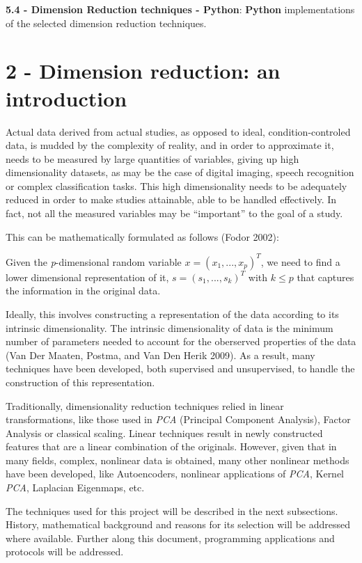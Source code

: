 \documentclass[]{article}
\begin{document}
\textbf{5.4 - Dimension Reduction techniques - Python}: \textbf{Python}
implementations of the selected dimension reduction techniques.

\section{2 - Dimension reduction: an
introduction}\label{dimension-reduction-an-introduction}

Actual data derived from actual studies, as opposed to ideal,
condition-controled data, is mudded by the complexity of reality, and in
order to approximate it, needs to be measured by large quantities of
variables, giving up high dimensionality datasets, as may be the case of
digital imaging, speech recognition or complex classification tasks.
This high dimensionality needs to be adequately reduced in order to make
studies attainable, able to be handled effectively. In fact, not all the
measured variables may be ``important'' to the goal of a study.

This can be mathematically formulated as follows (Fodor 2002):

Given the \emph{p}-dimensional random variable
\(x = (x_1,...,x_p)^{T}\), we need to find a lower dimensional
representation of it, \(s = (s_1,...,s_k)^T\) with \(k \le p\) that
captures the information in the original data.

Ideally, this involves constructing a representation of the data
according to its intrinsic dimensionality. The intrinsic dimensionality
of data is the minimum number of parameters needed to account for the
oberserved properties of the data ({Van Der Maaten}, Postma, and {Van
Den Herik} 2009). As a result, many techniques have been developed, both
supervised and unsupervised, to handle the construction of this
representation.

Traditionally, dimensionality reduction techniques relied in linear
transformations, like those used in \emph{PCA} (Principal Component
Analysis), Factor Analysis or classical scaling. Linear techniques
result in newly constructed features that are a linear combination of
the originals. However, given that in many fields, complex, nonlinear
data is obtained, many other nonlinear methods have been developed, like
Autoencoders, nonlinear applications of \emph{PCA}, Kernel \emph{PCA},
Laplacian Eigenmaps, etc.

The techniques used for this project will be described in the next
subsections. History, mathematical background and reasons for its
selection will be addressed where available. Further along this
document, programming applications and protocols will be addressed.
\end{document}
